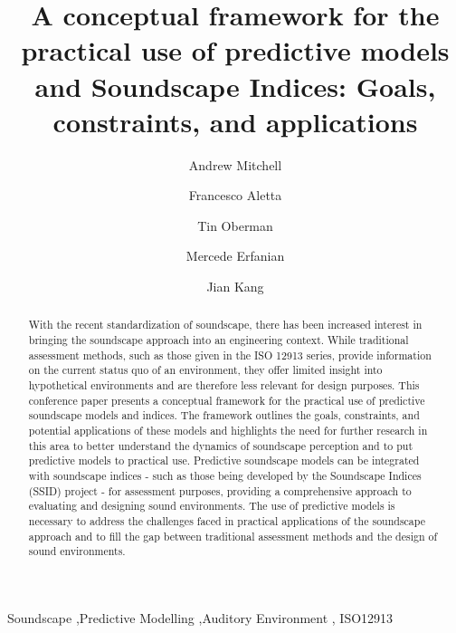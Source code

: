 \documentclass[
  authoryear,
  preprint,
  1p]{elsarticle}
\begin{document}
\begin{frontmatter}
\title{A conceptual framework for the practical use of predictive models
and Soundscape Indices: Goals, constraints, and applications}
\author[1]{Andrew Mitchell%
%
}
\author[1]{Francesco Aletta%
%
}
\author[1]{Tin Oberman%
%
}
\author[1]{Mercede Erfanian%
%
}
\author[1]{Jian Kang%
%
}







        
\begin{abstract}
With the recent standardization of soundscape, there has been increased
interest in bringing the soundscape approach into an engineering
context. While traditional assessment methods, such as those given in
the ISO 12913 series, provide information on the current status quo of
an environment, they offer limited insight into hypothetical
environments and are therefore less relevant for design purposes. This
conference paper presents a conceptual framework for the practical use
of predictive soundscape models and indices. The framework outlines the
goals, constraints, and potential applications of these models and
highlights the need for further research in this area to better
understand the dynamics of soundscape perception and to put predictive
models to practical use. Predictive soundscape models can be integrated
with soundscape indices - such as those being developed by the
Soundscape Indices (SSID) project - for assessment purposes, providing a
comprehensive approach to evaluating and designing sound environments.
The use of predictive models is necessary to address the challenges
faced in practical applications of the soundscape approach and to fill
the gap between traditional assessment methods and the design of sound
environments.
\end{abstract}





\begin{keyword}
    Soundscape \sep Predictive Modelling \sep Auditory Environment \sep 
    ISO12913
\end{keyword}
\end{frontmatter}
\end{document}
